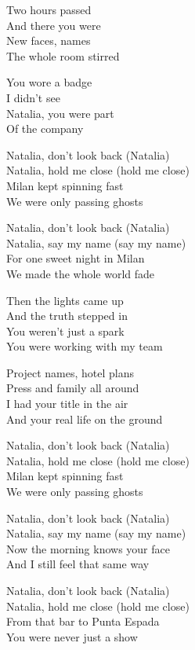 \begin{lyrics}
Two hours passed\\
And there you were\\
New faces, names\\
The whole room stirred

You wore a badge\\
I didn’t see\\
Natalia, you were part\\
Of the company

Natalia, don’t look back (Natalia)\\
Natalia, hold me close (hold me close)\\
Milan kept spinning fast\\
We were only passing ghosts

Natalia, don’t look back (Natalia)\\
Natalia, say my name (say my name)\\
For one sweet night in Milan\\
We made the whole world fade

Then the lights came up\\
And the truth stepped in\\
You weren’t just a spark\\
You were working with my team

Project names, hotel plans\\
Press and family all around\\
I had your title in the air\\
And your real life on the ground

Natalia, don’t look back (Natalia)\\
Natalia, hold me close (hold me close)\\
Milan kept spinning fast\\
We were only passing ghosts

Natalia, don’t look back (Natalia)\\
Natalia, say my name (say my name)\\
Now the morning knows your face\\
And I still feel that same way

Natalia, don’t look back (Natalia)\\
Natalia, hold me close (hold me close)\\
From that bar to Punta Espada\\
You were never just a show
\end{lyrics}

